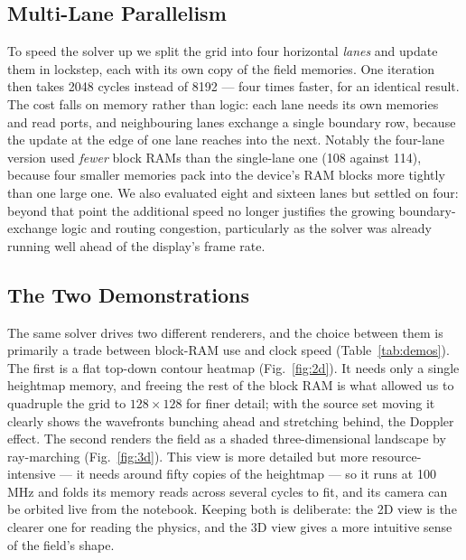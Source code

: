 \documentclass[11pt]{article}
\begin{document}
\subsection{Multi-Lane Parallelism}

To speed the solver up we split the grid into four horizontal \emph{lanes} and
update them in lockstep, each with its own copy of the field memories. One
iteration then takes 2048 cycles instead of 8192 --- four times faster, for an
identical result. The cost falls on memory rather than logic: each lane needs its
own memories and read ports, and neighbouring lanes exchange a single boundary
row, because the update at the edge of one lane reaches into the next. Notably the
four-lane version used \emph{fewer} block RAMs than the single-lane one (108
against 114), because four smaller memories pack into the device's RAM blocks more
tightly than one large one. We also evaluated eight and sixteen lanes but settled
on four: beyond that point the additional speed no longer justifies the growing
boundary-exchange logic and routing congestion, particularly as the solver was
already running well ahead of the display's frame rate.

\subsection{The Two Demonstrations}

The same solver drives two different renderers, and the choice between them is
primarily a trade between block-RAM use and clock speed (Table~\ref{tab:demos}).
The first is a flat top-down contour heatmap (Fig.~\ref{fig:2d}). It needs only a
single heightmap memory, and freeing the rest of the block RAM is what allowed us
to quadruple the grid to $128\times128$ for finer detail; with the
source set moving it clearly shows the wavefronts bunching ahead and stretching
behind, the Doppler effect. The second renders the field as a shaded
three-dimensional landscape by ray-marching (Fig.~\ref{fig:3d}). This view is more
detailed but more resource-intensive --- it needs around fifty copies of the
heightmap --- so it runs at 100\,MHz and folds its memory reads across several
cycles to fit, and its camera can be orbited live from the notebook. Keeping both
is deliberate: the 2D view is the clearer one for reading the physics, and the 3D
view gives a more intuitive sense of the field's shape.
\end{document}
